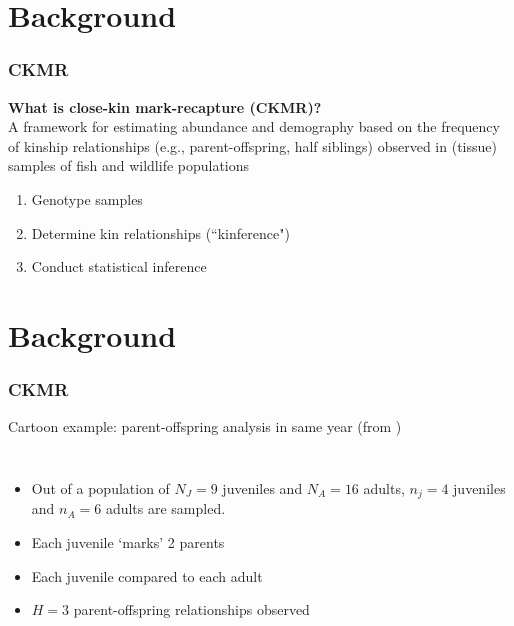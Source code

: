 \documentclass[serif,mathserif]{beamer}
\begin{document}
\section{Background} %
\begin{frame}
\frametitle{CKMR}
  \textcolor{noaaturq}{\textbf{What is close-kin mark-recapture (CKMR)?}} \\ \pause
  A framework for estimating abundance and demography based on the frequency of
  kinship relationships (e.g., parent-offspring, half siblings) observed in (tissue) samples of fish and wildlife populations
  \pause
  \begin{enumerate}
    \item Genotype samples
    \item Determine kin relationships (``kinference")
    \item Conduct statistical inference
  \end{enumerate}
\end{frame}

\section{Background} %
\begin{frame}
\frametitle{CKMR}
  \textcolor{noaaturq}{Cartoon example: parent-offspring analysis in same year (from \citet{BravingtonEtAl2016})} \\
  \begin{columns}[c]
  \column{2.4in}
    \begin{itemize}
      \item Out of a population of $N_J=9$ juveniles and $N_A = 16$ adults, $n_j=4$ juveniles and
        $n_A =6$ adults are sampled.
      \item Each juvenile `marks' 2 parents
      \item Each juvenile compared to each adult
      \item $H = 3$ parent-offspring relationships observed
    \end{itemize}
    \column{1.6in}
  \end{columns}
\end{frame}
\end{document}
